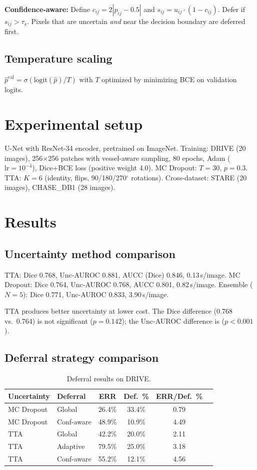 \documentclass[journal]{IEEEtran}
\begin{document}
\textbf{Confidence-aware:} Define $c_{ij} = 2|\hat{p}_{ij} - 0.5|$ and
$s_{ij} = u_{ij} \cdot (1 - c_{ij})$. Defer if $s_{ij} > \tau_s$. Pixels
that are uncertain \emph{and} near the decision boundary are deferred first.

\subsection{Temperature scaling}

$\hat{p}^{\text{cal}} = \sigma(\text{logit}(\hat{p}) / T)$ with $T$
optimized by minimizing BCE on validation logits.

\section{Experimental setup}

U-Net with ResNet-34 encoder, pretrained on ImageNet. Training: DRIVE (20
images), 256$\times$256 patches with vessel-aware sampling, 80 epochs, Adam
($\text{lr} = 10^{-4}$), Dice+BCE loss (positive weight 4.0). MC Dropout:
$T = 30$, $p = 0.3$. TTA: $K = 6$ (identity, flips, 90/180/270$^\circ$
rotations). Cross-dataset: STARE (20 images), CHASE\_DB1 (28 images).

\section{Results}

\subsection{Uncertainty method comparison}

TTA: Dice 0.768, Unc-AUROC 0.881, AUCC (Dice) 0.846, 0.13\,s/image.
MC Dropout: Dice 0.764, Unc-AUROC 0.768, AUCC 0.801, 0.82\,s/image.
Ensemble ($N = 5$): Dice 0.771, Unc-AUROC 0.833, 3.90\,s/image.

TTA produces better uncertainty at lower cost. The Dice difference (0.768
vs.\ 0.764) is not significant ($p = 0.142$); the Unc-AUROC difference is
($p < 0.001$).

\subsection{Deferral strategy comparison}

\begin{table}[t]
\centering
\caption{Deferral results on DRIVE.}
\small
\begin{tabular}{llcccc}
\toprule
Uncertainty & Deferral & ERR & Def.\ \% & ERR/Def.\ \% \\
\midrule
MC Dropout & Global & 26.4\% & 33.4\% & 0.79 \\
MC Dropout & Conf-aware & 48.9\% & 10.9\% & 4.49 \\
TTA & Global & 42.2\% & 20.0\% & 2.11 \\
TTA & Adaptive & 79.5\% & 25.0\% & 3.18 \\
TTA & Conf-aware & 55.2\% & 12.1\% & 4.56 \\
\bottomrule
\end{tabular}
\end{table}
\end{document}
